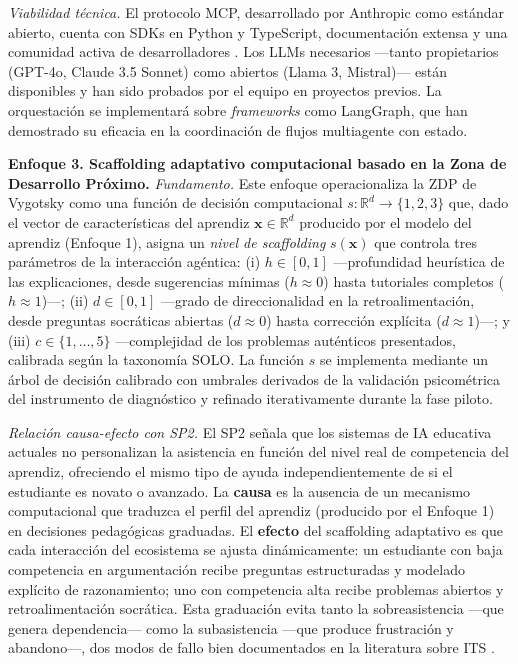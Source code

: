 \emph{Viabilidad técnica.}
El protocolo MCP, desarrollado por Anthropic como estándar abierto, cuenta con SDKs
en Python y TypeScript, documentación extensa y una comunidad activa de
desarrolladores \cite{anthropic2024mcp}. Los LLMs necesarios —tanto propietarios
(GPT-4o, Claude 3.5 Sonnet) como abiertos (Llama 3, Mistral)— están disponibles y
han sido probados por el equipo en proyectos previos. La orquestación se implementará
sobre \emph{frameworks} como LangGraph, que han demostrado su eficacia en la
coordinación de flujos multiagente con estado.

\medskip

\noindent\textbf{Enfoque 3. Scaffolding adaptativo computacional basado en la Zona
de Desarrollo Próximo.}
\emph{Fundamento.}
Este enfoque operacionaliza la ZDP de Vygotsky como una función de decisión
computacional $s: \mathbb{R}^d \to \{1, 2, 3\}$ que, dado el vector de
características del aprendiz $\mathbf{x} \in \mathbb{R}^d$ producido por el modelo
del aprendiz (Enfoque 1), asigna un \emph{nivel de scaffolding} $s(\mathbf{x})$ que
controla tres parámetros de la interacción agéntica: (i) $h \in [0,1]$ —profundidad
heurística de las explicaciones, desde sugerencias mínimas ($h \approx 0$) hasta
tutoriales completos ($h \approx 1$)—; (ii) $d \in [0,1]$ —grado de direccionalidad
en la retroalimentación, desde preguntas socráticas abiertas ($d \approx 0$) hasta
corrección explícita ($d \approx 1$)—; y (iii) $c \in \{1, \dots, 5\}$ —complejidad
de los problemas auténticos presentados, calibrada según la taxonomía SOLO. La
función $s$ se implementa mediante un árbol de decisión calibrado con umbrales
derivados de la validación psicométrica del instrumento de diagnóstico y refinado
iterativamente durante la fase piloto.

\emph{Relación causa-efecto con SP2.}
El SP2 señala que los sistemas de IA educativa actuales no personalizan la
asistencia en función del nivel real de competencia del aprendiz, ofreciendo el mismo
tipo de ayuda independientemente de si el estudiante es novato o avanzado. La
\textbf{causa} es la ausencia de un mecanismo computacional que traduzca el perfil
del aprendiz (producido por el Enfoque 1) en decisiones pedagógicas graduadas. El
\textbf{efecto} del scaffolding adaptativo es que cada interacción del ecosistema se
ajusta dinámicamente: un estudiante con baja competencia en argumentación recibe
preguntas estructuradas y modelado explícito de razonamiento; uno con competencia
alta recibe problemas abiertos y retroalimentación socrática. Esta graduación evita
tanto la sobreasistencia —que genera dependencia— como la subasistencia —que produce
frustración y abandono—, dos modos de fallo bien documentados en la literatura sobre
ITS \cite{hooshyar2024systematic}.

